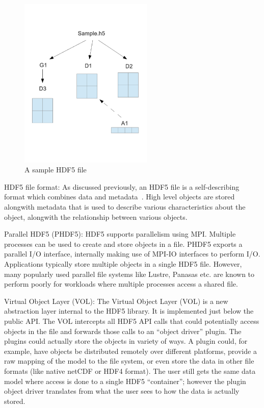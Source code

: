 \begin{figure}[!t]
\centering
\includegraphics[width=2.5in]{hdf5_example}
\caption{A sample HDF5 file}
\label{hdf5_example}
\end{figure}

HDF5 file format:
As discussed previously, an HDF5 file is a self-describing format which combines data and metadata~\cite{hdf5_fileformat}. High level objects are stored alongwith metadata that is used to describe various characteristics about the object, alongwith the relationship between various objects. 

Parallel HDF5 (PHDF5):
HDF5 supports parallelism using MPI. Multiple processes can be used to create and store objects in a file. PHDF5 exports a parallel I/O interface, internally making use of MPI-IO interfaces to perform I/O. 
Applications typically store multiple objects in a single HDF5 file. However, many popularly used parallel file systems like Lustre, Panasas etc. are known to perform poorly for workloads where multiple processes access a shared file. 

Virtual Object Layer (VOL):
The Virtual Object Layer (VOL) is a new abstraction layer internal to the HDF5 library. It is implemented just below the public API. The VOL intercepts all HDF5 API calls that could potentially access objects in the file and forwards those calls to an “object driver” plugin. The plugins could actually store the objects in variety of ways. A plugin could, for example, have objects be distributed remotely over different platforms, provide a raw mapping of the model to the file system, or even store the data in other file formats (like native netCDF or HDF4 format). The user still gets the same data model where access is done to a single HDF5 “container”; however the plugin object driver translates from what the user sees to how the data is actually stored.

